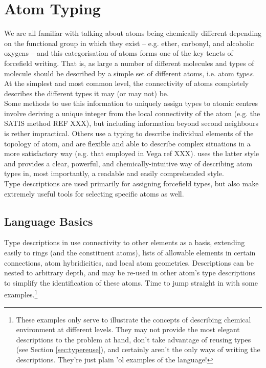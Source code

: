 \chapter{Atom Typing}
\label{sec:typing}

We are all familiar with talking about atoms being chemically different depending on the functional group in which they exist -- e.g. ether, carbonyl, and alcoholic oxygens -- and this categorisation of atoms forms one of the key tenets of forcefield writing. That is, as large a number of different molecules and types of molecule should be described by a simple set of different atoms, i.e. atom $types$. At the simplest and most common level, the connectivity of atoms completely describes the different types it may (or may not) be. \\

Some methods to use this information to uniquely assign types to atomic centres involve deriving a unique integer from the local connectivity of the atom (e.g. the SATIS method REF XXX), but including information beyond second neighbours is rether impractical. Others use a typing  to describe individual elements of the topology of atom, and are flexible and able to describe complex situations in a more satisfactory way (e.g. that employed in Vega ref XXX). \progname{} uses the latter style and provides a clear, powerful, and chemically-intuitive way of describing atom types in, most importantly, a readable and easily comprehended style. \\

Type descriptions are used primarily for assigning forcefield types, but also make extremely useful tools for selecting specific atoms as well.

\section{Language Basics}

Type descriptions in \progname{} use connectivity to other elements as a basis, extending easily to rings (and the constituent atoms), lists of allowable elements in certain connections, atom hybridicities, and local atom geometries. Descriptions can be nested to arbitrary depth, and may be re-used in other atom's type descriptions to simplify the identification of these atoms. Time to jump straight in with some examples.\footnote{These examples only serve to illustrate the concepts of describing chemical environment at different levels. They may not provide the most elegant descriptions to the problem at hand, don't take advantage of reusing types (see Section \ref{sec:typereuse}), and certainly aren't the only ways of writing the descriptions. They're just plain 'ol examples of the language!}

